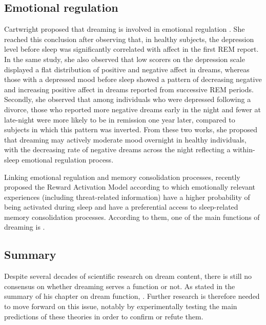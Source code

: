\subsection{Emotional regulation}
\label{sec:dream-func:modern:emotion}

Cartwright proposed that dreaming is involved in emotional regulation \citep{cartwright_role_1998, cartwright_role_1998-1}. She reached this conclusion after observing that, in healthy subjects, the depression level before sleep was significantly correlated with affect in the first REM report. In the same study, she also observed that low scorers on the depression scale displayed a flat distribution of positive and negative affect in dreams, whereas those with a depressed mood before sleep showed a pattern of decreasing negative and increasing positive affect in dreams reported from successive REM periods. Secondly, she observed that among individuals who were depressed following a divorce, those who reported more negative dreams early in the night and fewer at late-night were more likely to be in remission one year later, compared to subjects in which this pattern was inverted. From these two works, she proposed that dreaming may actively moderate mood overnight in healthy individuals, with the decreasing rate of negative dreams across the night reflecting a within-sleep emotional regulation process.

Linking emotional regulation and memory consolidation processes, \citet{perogamvros_roles_2012} recently proposed the Reward Activation Model according to which emotionally relevant experiences (including threat-related information) have a higher probability of being activated during sleep and have a preferential access to sleep-related memory consolidation processes. According to them, one of the main functions of dreaming is  \citep{meerlo_sleep_2013}.

\subsection{Summary}
\label{sec:dream-func:modern:summary}

Despite several decades of scientific research on dream content, there is still no consensus on whether dreaming serves a function or not. As \citet{blagrove_distinguishing_2011} stated in the summary of his chapter on dream function, . Further research is therefore needed to move forward on this issue, notably by experimentally testing the main predictions of these theories in order to confirm or refute them.
